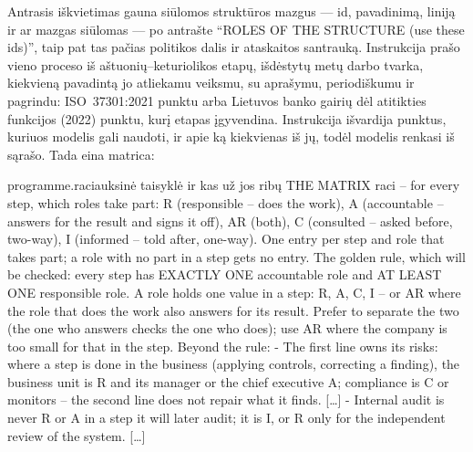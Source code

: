 Antrasis iškvietimas gauna siūlomos struktūros mazgus --- id, pavadinimą, liniją ir ar mazgas
siūlomas --- po antrašte \enquote{ROLES OF THE STRUCTURE (use these ids)}, taip pat tas pačias
politikos dalis ir ataskaitos santrauką. Instrukcija  prašo vieno
proceso iš aštuonių--keturiolikos etapų, išdėstytų metų darbo tvarka, kiekvieną pavadintą jo
atliekamu veiksmu, su aprašymu, periodiškumu ir pagrindu: ISO~37301:2021 punktu arba Lietuvos
banko gairių dėl atitikties funkcijos (2022) punktu, kurį etapas įgyvendina. Instrukcija
išvardija punktus, kuriuos modelis gali naudoti, ir apie ką kiekvienas iš jų, todėl modelis
renkasi iš sąrašo. Tada eina matrica:

\begin{promptexcerpt}{programme.raci}{auksinė taisyklė ir kas už jos ribų}
THE MATRIX
raci – for every step, which roles take part: R (responsible – does the work), A (accountable – answers for the result and signs it off), AR (both), C (consulted – asked before, two-way), I (informed – told after, one-way). One entry per step and role that takes part; a role with no part in a step gets no entry.
The golden rule, which will be checked: every step has EXACTLY ONE accountable role and AT LEAST ONE responsible role. A role holds one value in a step: R, A, C, I – or AR where the role that does the work also answers for its result. Prefer to separate the two (the one who answers checks the one who does); use AR where the company is too small for that in the step.
Beyond the rule:
- The first line owns its risks: where a step is done in the business (applying controls, correcting a finding), the business unit is R and its manager or the chief executive A; compliance is C or monitors – the second line does not repair what it finds.
[…]
- Internal audit is never R or A in a step it will later audit; it is I, or R only for the independent review of the system.
[…]
\end{promptexcerpt}

